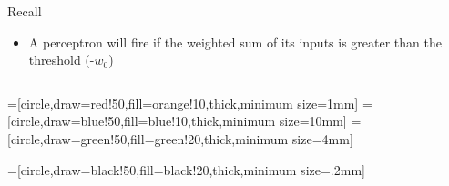 \documentclass[aspectratio=169]{beamer}
\begin{document}
\begin{frame}
\begin{block}{Recall}

\begin{itemize}
\item A perceptron will fire if the weighted sum of its inputs is greater than the threshold (-$w_0$)

\end{itemize}
\end{block}
\end{frame}


\begin{frame}
\begin{columns}

\begin{overlayarea}{\textwidth}{\textheight}
\begin{center}

=[circle,draw=red!50,fill=orange!10,thick,minimum size=1mm]
=[circle,draw=blue!50,fill=blue!10,thick,minimum size=10mm]
=[circle,draw=green!50,fill=green!20,thick,minimum size=4mm]

=[circle,draw=black!50,fill=black!20,thick,minimum size=.2mm]



\end{center}

\end{overlayarea}


\end{columns}
\end{frame}
\end{document}
